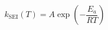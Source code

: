 \documentclass[preview]{standalone}
\begin{document}
\[k_{\mathrm{SEI}}(T) = A \exp\left(-\frac{E_a}{RT}\right) \tag{7.3}\]
\end{document}
